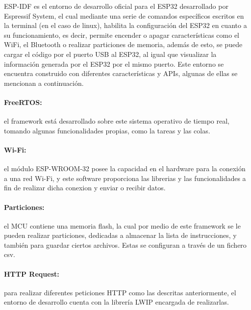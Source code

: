 ESP-IDF es el entorno de desarrollo oficial para el ESP32 desarrollado por Espressif System, el cual mediante una serie de comandos específicos escritos en la terminal (en el caso de linux), habilita la configuración del ESP32 en cuanto a su funcionamiento, es decir, permite encender o apagar características como el WiFi, el Bluetooth o realizar particiones de memoria, además de esto, se puede cargar el código por el puerto USB al ESP32, al igual que visualizar la información generada por el ESP32 por el mismo puerto. Este entorno se encuentra construido con diferentes características y APIs, algunas de ellas se mencionan a continuación. \cite{ES}

\paragraph{FreeRTOS:}el framework está desarrollado sobre este sistema operativo de tiempo real, tomando algunas funcionalidades propias, como la tareas y las colas.

\paragraph{Wi-Fi:}el módulo ESP-WROOM-32 posee la capacidad en el hardware para la conexión a una red Wi-Fi, y este software proporciona las librerias y las funcionalidades a fin de realizar dicha conexion y enviar o recibir datos.

\paragraph{Particiones:}el MCU contiene una memoria flash, la cual por medio de este framework se le pueden realizar particiones, dedicadas a almacenar la lista de instrucciones, y también para guardar ciertos archivos. Estas se configuran a través de un fichero csv.


\paragraph{HTTP Request:}para realizar diferentes peticiones HTTP como las descritas anteriormente, el entorno de desarrollo cuenta con la librería LWIP encargada de realizarlas.

